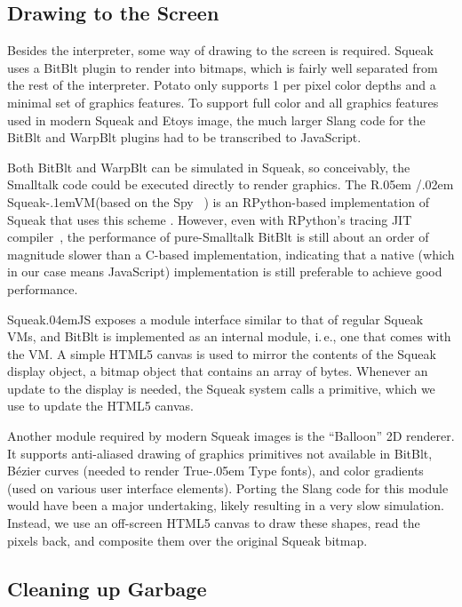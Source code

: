 \documentclass[natbib]{sigplanconf}
\newcommand*\SqueakJS{Squeak\texorpdfstring{\kern.04em}{}JS\xspace}
\newcommand*\JS{JavaScript\xspace}
\newcommand*\RSqueakVM{R\kern.05em /\kern.02em Squeak\kern-.1emVM\xspace}
\begin{document}
\subsection{Drawing to the Screen}
Besides the interpreter, some way of drawing to the screen is
required. Squeak uses a BitBlt plugin to render into bitmaps, which is
fairly well separated from the rest of the interpreter. Potato only
supports \SI{1}{\bit} per pixel color depths and a minimal set of
graphics features. To support full color and all graphics features
used in modern Squeak and Etoys image, the much larger Slang code for
the BitBlt and WarpBlt plugins had to be transcribed to \JS.

Both BitBlt and WarpBlt can be simulated in Squeak, so conceivably,
the Smalltalk code could be executed directly to render graphics. The
\RSqueakVM (based on the Spy%
~\cite{Bolz+2008:Back-to-the-Future-in-One-Week}) is an RPython-based
implementation of Squeak that uses this scheme \cite{Wassermann13}.
However, even with RPython's tracing \ac{JIT} compiler~\cite{Bolz12},
the performance of pure-Smalltalk BitBlt is still about an order of
magnitude slower than a C-based implementation, indicating that a
native (which in our case means \JS) implementation is still
preferable to achieve good performance.

\SqueakJS exposes a module interface similar to that of regular Squeak
\acp{VM}, and BitBlt is implemented as an internal module, i.\,e., one
that comes with the \ac{VM}. A simple HTML5 canvas is used to mirror
the contents of the Squeak display object, a bitmap object that
contains an array of bytes. Whenever an update to the display is
needed, the Squeak system calls a primitive, which we use to update
the HTML5 canvas.

Another module required by modern Squeak images is the ``Balloon'' 2D
renderer. It supports anti-aliased drawing of graphics primitives not
available in BitBlt, \eg Bézier curves (needed to render
True\kern-.05em Type fonts), and color gradients (used on various user
interface elements). Porting the Slang code for this module would have
been a major undertaking, likely resulting in a very slow simulation.
Instead, we use an off-screen HTML5 canvas to draw these shapes, read
the pixels back, and composite them over the original Squeak bitmap.

\subsection{Cleaning up Garbage}
\end{document}
